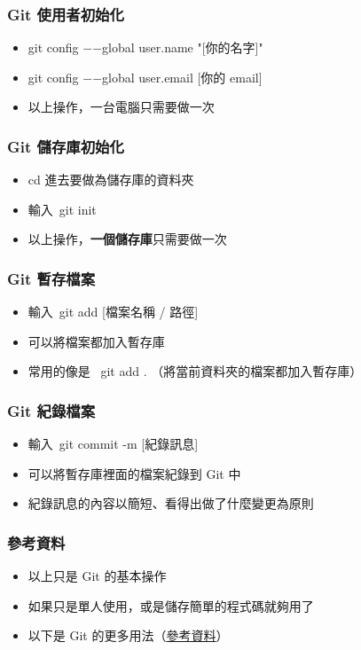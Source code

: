 \documentclass[mathserif]{beamer}
\begin{document}
\begin{frame}
    \frametitle{Git 使用者初始化}
    \begin{itemize}
        \item {\color{red} git config −−global user.name "[你的名字]"}
        \item {\color{red} git config −−global user.email [你的 email]}
        \item 以上操作，一台電腦只需要做一次
    \end{itemize}
\end{frame}

\begin{frame}
    \frametitle{Git 儲存庫初始化}
    \begin{itemize}
        \item {\color{red}cd} 進去要做為儲存庫的資料夾
        \item 輸入\ {\color{red}git init}
        \item 以上操作，\textbf{一個儲存庫}只需要做一次
    \end{itemize}
\end{frame}

\begin{frame}
    \frametitle{Git 暫存檔案}
    \begin{itemize}
        \item 輸入\ {\color{red}git add [檔案名稱 / 路徑]}
        \item 可以將檔案都加入暫存庫
        \vspace{0.5cm}
        \item<2-> 常用的像是\ {\color{red} git add .} （將當前資料夾的檔案都加入暫存庫）
    \end{itemize}
\end{frame}

\begin{frame}
    \frametitle{Git 紀錄檔案}
    \begin{itemize}
        \item 輸入\ {\color{red}git commit -m [紀錄訊息]}
        \item 可以將暫存庫裡面的檔案紀錄到 Git 中
        \vspace{0.5cm}
        \item<2-> 紀錄訊息的內容以簡短、看得出做了什麼變更為原則
    \end{itemize}
\end{frame}

\begin{frame}
    \frametitle{參考資料}
    \begin{itemize}
        \item 以上只是 Git 的基本操作
        \item 如果只是單人使用，或是儲存簡單的程式碼就夠用了
        \item 以下是 Git 的更多用法（\href{https://backlog.com/git-tutorial/tw/}{參考資料}）
    \end{itemize}

    

\end{frame}
\end{document}
